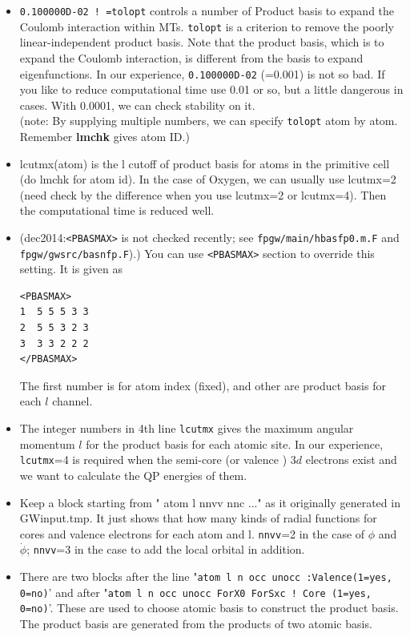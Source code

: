 \documentclass[a4paper,10pt,epsf,fleqn]{article}
\newcommand{\exe}[1]{{\bf #1}}
\newcommand{\io}[1]{{\sf  #1}}
\newcommand{\raw}[1]{{\tt #1}}
\begin{document}
{\begin{itemize}
\item
\verb+0.100000D-02 ! =tolopt+ controls a number of Product basis
to expand the Coulomb interaction within MTs. 
\raw{tolopt} is a criterion to remove the poorly linear-independent product basis.
Note that the product basis, which is to expand the
Coulomb interaction, is different from the basis to expand eigenfunctions.
In our experience, \verb+0.100000D-02+ (=0.001) is not so bad.
If you like to reduce computational time use 0.01 or so, but a little
dangerous in cases. With 0.0001, we can check stability on it.\\
(note: By supplying multiple numbers, we can specify \raw{tolopt} atom by atom.
 Remember \exe{lmchk} gives atom ID.)

\item
     lcutmx(atom) is the l cutoff of product basis for atoms 
     in the primitive cell (do lmchk for atom id).
     In the case of Oxygen, we can usually use lcutmx=2 (need check by
     the difference when you use lcutmx=2 or lcutmx=4). 
     Then the computational time is reduced well.

\item
(dec2014:\verb#<PBASMAX># is not checked recently;
see \verb#fpgw/main/hbasfp0.m.F# and \verb#fpgw/gwsrc/basnfp.F#).)
You can use \verb#<PBASMAX># section to override this setting. It is given as
\begin{verbatim}
<PBASMAX>
1  5 5 5 3 3
2  5 5 3 2 3
3  3 3 2 2 2
</PBASMAX>
\end{verbatim}
The first number is for atom index (fixed), and other are product basis 
for each $l$ channel.


\item
The integer numbers in 4th line \raw{lcutmx}
gives the maximum angular momentum $l$ for the product basis
for each atomic site.
In our experience, \raw{lcutmx}=4 is required
when the semi-core (or valence ) $3d$ electrons exist
and we want to calculate the QP energies of them.

\item
Keep a block starting from 
"  atom   l  nnvv  nnc ..."  as it originally generated 
in \io{GWinput.tmp}. It just shows that how many kinds of radial functions
for cores and valence electrons for each atom and l.
{\tt nnvv}=2 in the case of $\phi$ and $\dot{\phi}$;
{\tt nnvv}=3 in the case to add the local orbital in addition.

\item
There are two blocks after the line
"{\tt   atom   l    n  occ  unocc  :Valence(1=yes, 0=no)}'
and after
"{\tt   atom   l    n  occ unocc  ForX0 ForSxc ! Core (1=yes, 0=no)}'.
These are used to choose atomic basis to construct the product basis.
The product basis are generated from the products of two atomic basis.


\end{itemize}}
\end{document}
